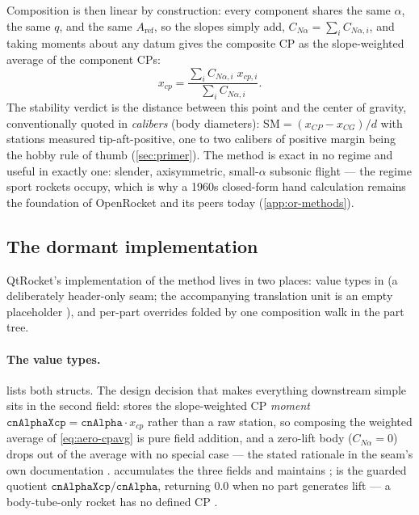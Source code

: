 \begin{physbox}
Composition is then linear by construction: every component shares the same $\alpha$, the
same $q$, and the same $A_{\mathrm{ref}}$, so the slopes simply add,
$C_{N\alpha} = \sum_i C_{N\alpha,i}$, and taking moments about any datum gives the composite
CP as the slope-weighted average of the component CPs:
\begin{equation}
x_{cp} = \frac{\sum_i C_{N\alpha,i}\;x_{cp,i}}{\sum_i C_{N\alpha,i}}.
\label{eq:aero-cpavg}
\end{equation}
The stability verdict is the distance between this point and the center of gravity,
conventionally quoted in \emph{calibers} (body diameters):
$\mathrm{SM} = (x_{CP} - x_{CG})/d$ with stations measured tip-aft-positive, one to two
calibers of positive margin being the hobby rule of thumb (\cref{sec:primer}). The method is
exact in no regime and useful in exactly one: slender, axisymmetric, small-$\alpha$ subsonic
flight --- the regime sport rockets occupy, which is why a 1960s closed-form hand calculation
remains the foundation of OpenRocket and its peers today (\cref{app:or-methods}).
\end{physbox}

\subsection{The dormant implementation}\label{sec:aero-seam}

QtRocket's implementation of the method lives in two places: value types in
 (a deliberately header-only seam; the accompanying translation unit is an
empty placeholder ), and per-part  overrides folded by
one composition walk in the part tree.

\paragraph{The value types.}  lists both structs. The design decision
that makes everything downstream simple sits in the second field: 
stores the slope-weighted CP \emph{moment}
$\mathtt{cnAlphaXcp} = \mathtt{cnAlpha}\cdot x_{cp}$ rather than a raw station, so composing
the weighted average of \cref{eq:aero-cpavg} is pure field addition, and a zero-lift body
($C_{N\alpha} = 0$) drops out of the average with no special case --- the stated rationale in
the seam's own documentation . 
accumulates the three fields and maintains  ; 
is the guarded quotient $\mathtt{cnAlphaXcp}/\mathtt{cnAlpha}$, returning $0.0$ when no part
generates lift --- a body-tube-only rocket has no defined CP .


